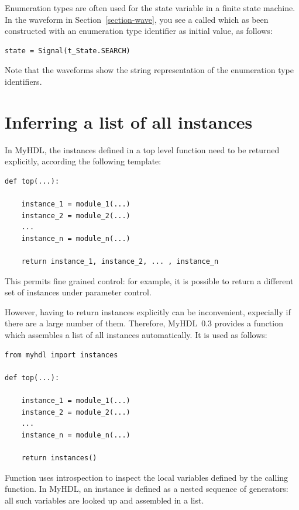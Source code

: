 \documentclass{howto}
\newcommand{\myhdl}{\protect \mbox{MyHDL}}
\begin{document}
Enumeration types are often used for the state variable in a finite
state machine.  In the waveform in Section~\ref{section-wave}, you see
a  called  which as been constructed with an
enumeration type identifier as initial value, as follows:

\begin{verbatim}
state = Signal(t_State.SEARCH)
\end{verbatim}

Note that the waveforms show the string representation of the
enumeration type identifiers. 

\section{Inferring a list of all instances\label{section-instances}}

In \myhdl{}, the instances defined in a top level function
need to be returned explicitly, according
the following template:

\begin{verbatim}
def top(...):

    instance_1 = module_1(...)
    instance_2 = module_2(...)
    ...
    instance_n = module_n(...)

    return instance_1, instance_2, ... , instance_n
\end{verbatim}


This permits fine grained control: for example, it
is possible to return a different set of instances
under parameter control. 

However, having to return instances explicitly can be inconvenient,
expecially if there are a large number of them. Therefore, \myhdl\ 0.3
provides a function  which assembles a list of
all instances automatically. It is used as follows:

\begin{verbatim}
from myhdl import instances

def top(...):

    instance_1 = module_1(...)
    instance_2 = module_2(...)
    ...
    instance_n = module_n(...)

    return instances()
\end{verbatim}

Function  uses introspection to
inspect the local variables defined by the calling
function. In \myhdl {}, an instance is defined as
a nested sequence of generators: all such variables
are looked up and assembled in a list.
\end{document}
